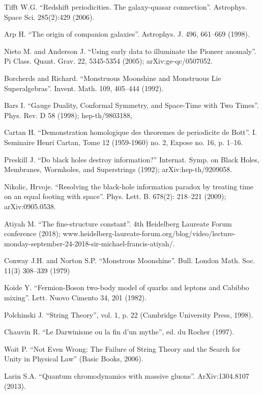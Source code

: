 \documentclass[twoside,draft]{article}
\begin{document}
\begin{sloppypar}
{\begin{thebibliography}{99}
 Tifft W.G. ``Redshift periodicities. The galaxy-quasar
connection''. Astrophys. Space Sci. 285(2):429 (2006).

 Arp H. ``The origin of companion galaxies''. Astrophys. J. 496,
661--669 (1998).

 Nieto M. and Anderson J. ``Using early data to illuminate the
Pioneer anomaly''. Pi Class. Quant. Grav. 22, 5345-5354 (2005);
arXiv:ge-qc/0507052.

 Borcherds and Richard. ``Monstruous Moonshine and Monstruous Lie
Superalgebras''. Invent. Math. 109, 405--444 (1992).

 Bars I. ``Gauge Duality, Conformal Symmetry, and Space-Time with
Two Times''. Phys. Rev. D 58 (1998); hep-th/9803188, 

 Cartan H. ``Demonstration homologique des theoremes de periodicite
de Bott''. I. Seminaire Henri Cartan, Tome 12 (1959-1960) no. 2, Expose no. 16,
p. 1--16.  

 Preskill J. ``Do black holes destroy information?'' Internat.
Symp. on Black Holes, Membranes, Wormholes, and Superstrings (1992);
arXiv:hep-th/9209058.

 Nikolic, Hrvoje. ``Resolving the black-hole information paradox by
treating time on an equal footing with space''. Phys. Lett. B. 678(2):
218--221 (2009); arXiv:0905.0538.

 Atiyah M. ``The fine-structure constant''. 4th Heidelberg Laureate
Forum conference (2018); www.heidelberg-laureate-forum.org/blog/video/lecture-monday-september-24-2018-sir-michael-francis-atiyah/.

 Conway J.H. and Norton S.P. ``Monstrous Moonshine''. Bull. London
Math. Soc. 11(3) 308--339 (1979)

 Koide Y. ``Fermion-Boson two-body model of quarks and leptons and
Cabibbo mixing''.  Lett. Nuovo Cimento 34, 201 (1982).

 Polchinski J. ``String Theory'', vol. 1, p. 22 (Cambridge
University Press, 1998).

 Chauvin R. ``Le Darwinisme ou la fin d'un mythe'', ed. du Rocher
(1997).

 Woit P. ``Not Even Wrong: The Failure of String Theory and the
Search for Unity in Physical Law'' (Basic Books, 2006).

 Larin S.A. ``Quantum chromodynamics with massive gluons''.
ArXiv:1304.8107 (2013).


\end{thebibliography}}
\end{sloppypar}
\end{document}
